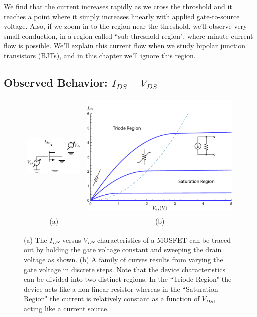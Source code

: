 We find that the current increases rapidly as we cross the throshold and it reaches a point where it simply increases linearly with applied gate-to-source voltage.  Also, if we zoom in to the region near the threshold, we'll observe very small conduction, in a region called ``sub-threshold region", where minute current flow is possible.  We'll explain this current flow when we study bipolar junction transistors (BJTs), and in this chapter we'll ignore this region.  

\subsection{Observed Behavior: $I_{DS} - V_{DS}$}



\begin{figure}[tb]
\begin{center}
\begin{tabular}{cc}
\includegraphics[width=.3\columnwidth]{idvds_sweep} &
\includegraphics[width=.6\columnwidth]{ids_vds} \\
(a) & (b) \\
\end{tabular}
\end{center}
\caption{(a) The $I_{DS}$ versus $V_{DS}$ characteristics of a MOSFET can be traced out by holding the gate voltage constant and sweeping the drain voltage as shown.  (b) A family of curves results from varying the gate voltage in discrete steps.  Note that the device characteristics can be divided into two distinct regions.  In the ``Triode Region" the device acts like a non-linear resistor whereas in the ``Saturation Region" the current is relatively constant as a function of $V_{DS}$, acting like a current source.} \label{fig:ids_vds}
\end{figure}

